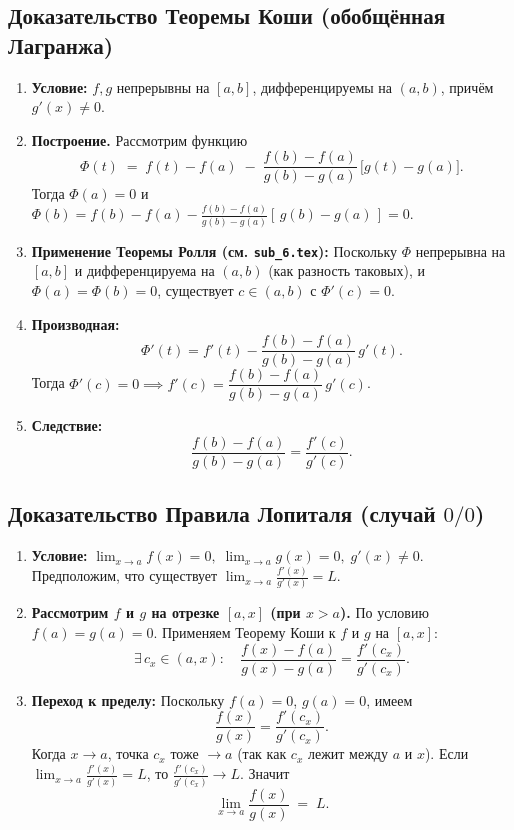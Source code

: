 \medskip


\subsection*{Доказательство Теоремы Коши (обобщённая Лагранжа)}

\begin{enumerate}
  \item \textbf{Условие:} $f, g$ непрерывны на $[a,b]$, дифференцируемы на $(a,b)$, причём $g'(x)\neq0$.  
  \item \textbf{Построение.} Рассмотрим функцию
    \[
      \Phi(t) \;=\; f(t) - f(a) \;-\; \frac{f(b)-f(a)}{g(b)-g(a)}\,\bigl[g(t)-g(a)\bigr].
    \]
    Тогда $\Phi(a)=0$ и \(\Phi(b)=f(b)-f(a)-\tfrac{f(b)-f(a)}{g(b)-g(a)}[\,g(b)-g(a)\,]=0\).  
  \item \textbf{Применение Теоремы Ролля (см. \texttt{sub\_6.tex}):}  
    Поскольку $\Phi$ непрерывна на $[a,b]$ и дифференцируема на $(a,b)$ (как разность таковых), и $\Phi(a)=\Phi(b)=0$, существует $c\in(a,b)$ с \(\Phi'(c)=0\).  
  \item \textbf{Производная:} 
    \[
    \Phi'(t)=f'(t) - \frac{f(b)-f(a)}{g(b)-g(a)}\,g'(t).
    \]
    Тогда $\Phi'(c)=0 \implies f'(c)=\dfrac{f(b)-f(a)}{g(b)-g(a)}\,g'(c)$.  
  \item \textbf{Следствие:} 
    \[
      \frac{f(b)-f(a)}{g(b)-g(a)} = \frac{f'(c)}{g'(c)}.
    \]
\end{enumerate}

\medskip

\subsection*{Доказательство Правила Лопиталя (случай $0/0$)}

\begin{enumerate}
  \item \textbf{Условие:} $\lim_{x\to a}f(x)=0,\; \lim_{x\to a}g(x)=0,\; g'(x)\neq0$. Предположим, что существует $\lim_{x\to a}\frac{f'(x)}{g'(x)}=L$.  
  \item \textbf{Рассмотрим $f$ и $g$ на отрезке $[a,x]$ (при $x>a$).}  
    По условию $f(a)=g(a)=0$. Применяем Теорему Коши к $f$ и $g$ на $[a,x]$:
    \[
      \exists\,c_x\in(a,x): \quad \frac{f(x)-f(a)}{g(x)-g(a)} = \frac{f'(c_x)}{g'(c_x)}.
    \]
  \item \textbf{Переход к пределу:}  
    Поскольку $f(a)=0$, $g(a)=0$, имеем
    \[
      \frac{f(x)}{g(x)} = \frac{f'(c_x)}{g'(c_x)}.
    \]
    Когда $x\to a$, точка $c_x$ тоже $\to a$ (так как $c_x$ лежит между $a$ и $x$). Если \(\lim_{x\to a}\frac{f'(x)}{g'(x)}=L\), то \(\frac{f'(c_x)}{g'(c_x)}\to L\).  
    Значит
    \[
      \lim_{x\to a}\frac{f(x)}{g(x)} \;=\; L.
    \]
\end{enumerate}

